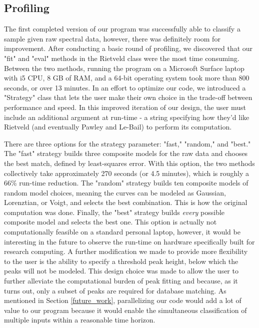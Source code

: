 \documentclass{dhbenelux}
\begin{document}

\subsection{Profiling} \label{profiling}

The first completed version of our program was successfully able to classify a sample given raw spectral data, however, there was definitely room for improvement. After conducting a basic round of profiling, we discovered that our "fit" and "eval" methods in the Rietveld class were the most time consuming. Between the two methods, running the program on a Microsoft Surface laptop with i5 CPU, 8 GB of RAM, and a 64-bit operating system took more than 800 seconds, or over 13 minutes. In an effort to optimize our code, we introduced a "Strategy" class that lets the user make their own choice in the trade-off between performance and speed. In this improved iteration of our design, the user must include an additional argument at run-time - a string specifying how they'd like Rietveld (and eventually Pawley and Le-Bail) to perform its computation. 

There are three options for the strategy parameter: "fast," "random," and "best." The "fast" strategy builds three composite models for the raw data and chooses the best match, defined by least-squares error. With this option, the two methods collectively take approximately 270 seconds (or 4.5 minutes), which is roughly a 66\% run-time reduction. The "random" strategy builds ten composite models of random model choices, meaning the curves can be modeled as Gaussian, Lorenztian, or Voigt, and selects the best combination. This is how the original computation was done. Finally, the "best" strategy builds \textit{every} possible composite model and selects the best one. This option is actually not computationally feasible on a standard personal laptop, however, it would be interesting in the future to observe the run-time on hardware specifically built for research computing. A further modification we made to provide more flexibility to the user is the ability to specify a threshold peak height, below which the peaks will not be modeled. This design choice was made to allow the user to further alleviate the computational burden of peak fitting and because, as it turns out, only a subset of peaks are required for database matching. As mentioned in Section \ref{future_work}, parallelizing our code would add a lot of value to our program because it would enable the simultaneous classification of multiple inputs within a reasonable time horizon. 
 
\end{document}
